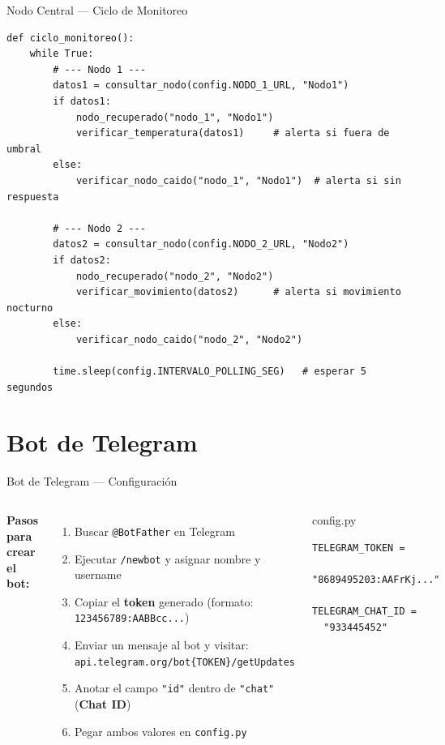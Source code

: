 \documentclass[aspectratio=169]{beamer}
\begin{document}
\begin{frame}[fragile]{Nodo Central --- Ciclo de Monitoreo}

\begin{lstlisting}
def ciclo_monitoreo():
    while True:
        # --- Nodo 1 ---
        datos1 = consultar_nodo(config.NODO_1_URL, "Nodo1")
        if datos1:
            nodo_recuperado("nodo_1", "Nodo1")
            verificar_temperatura(datos1)     # alerta si fuera de umbral
        else:
            verificar_nodo_caido("nodo_1", "Nodo1")  # alerta si sin respuesta

        # --- Nodo 2 ---
        datos2 = consultar_nodo(config.NODO_2_URL, "Nodo2")
        if datos2:
            nodo_recuperado("nodo_2", "Nodo2")
            verificar_movimiento(datos2)      # alerta si movimiento nocturno
        else:
            verificar_nodo_caido("nodo_2", "Nodo2")

        time.sleep(config.INTERVALO_POLLING_SEG)   # esperar 5 segundos
\end{lstlisting}
\end{frame}

\section{Bot de Telegram}

\begin{frame}[fragile]{Bot de Telegram --- Configuraci\'on}

\begin{columns}
\textbf{Pasos para crear el bot:}
\begin{enumerate}
  \item Buscar \texttt{@BotFather} en Telegram
  \item Ejecutar \texttt{/newbot} y asignar nombre y username
  \item Copiar el \textbf{token} generado (formato: \texttt{123456789:AABBcc...})
  \item Enviar un mensaje al bot y visitar:\\
        \texttt{api.telegram.org/bot\{TOKEN\}/getUpdates}
  \item Anotar el campo \texttt{"id"} dentro de \texttt{"chat"} (\textbf{Chat ID})
  \item Pegar ambos valores en \texttt{config.py}
\end{enumerate}

\begin{exampleblock}{config.py}
\begin{lstlisting}
TELEGRAM_TOKEN =
  "8689495203:AAFrKj..."

TELEGRAM_CHAT_ID =
  "933445452"
\end{lstlisting}
\end{exampleblock}
\end{columns}
\end{frame}
\end{document}
